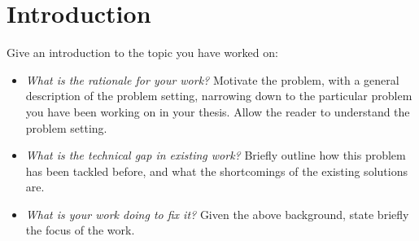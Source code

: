 %


\chapter{Introduction}
Give an introduction to the topic you have worked on:

\begin{itemize}
 \item \textit{What is the rationale for your work?} Motivate the problem, \eg with a general description of the problem setting, narrowing down to the particular problem you have been working on in your thesis. Allow the reader to understand the problem setting. 
 \item \textit{What is the technical gap in existing work?} Briefly outline how this problem has been tackled before, and what the shortcomings of the existing solutions are.
 \item \textit{What is your work doing to fix it?} Given the above background, state briefly the focus of the work. 
\end{itemize}

